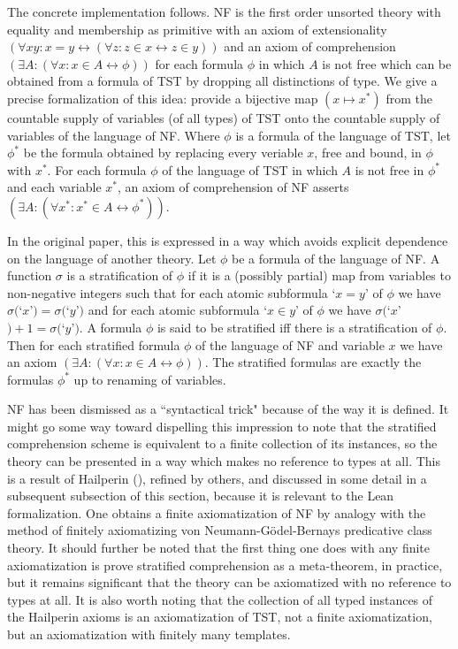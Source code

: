 \documentclass[112pt]{article}
\begin{document}
The concrete implementation follows.  NF is the first order unsorted theory with equality and membership as primitive with an axiom of extensionality $(\forall xy:x=y \leftrightarrow (\forall z:z \in x \leftrightarrow z\in y))$ and an axiom of comprehension $(\exists A:(\forall x:x \in A \leftrightarrow \phi))$ for each formula $\phi$ in which $A$ is not free which can be obtained from a formula of TST by dropping all distinctions of type.  We give a precise formalization of this idea:  provide a bijective map $(x \mapsto x^*)$ from the countable supply of variables (of all types) of TST onto the countable supply of variables of the language of NF.  Where $\phi$ is a formula of the language of TST, let $\phi^*$ be the formula obtained by replacing every veriable $x$, free and bound,
in $\phi$ with $x^*$. For each formula $\phi$ of the language of TST in which $A$ is not free in $\phi^*$ and each variable $x^*$, an axiom of comprehension of NF asserts $(\exists A:(\forall x^*:x^* \in A \leftrightarrow \phi^*))$.

In the original paper, this is expressed in a way which avoids explicit dependence on the language of another theory.  Let $\phi$ be a formula of the language of
NF.  A function $\sigma$ is a stratification of $\phi$ if it is a (possibly partial) map from variables to non-negative integers such that for each atomic subformula
`$x=y$'  of $\phi$ we have $\sigma($`$x$'$)=\sigma($`$y$'$)$ and for each atomic subformula `$x \in y$' of $\phi$ we have $\sigma($`$x$'$)+1 = \sigma($`$y$'$)$.
A formula $\phi$ is said to be stratified iff there is a stratification of $\phi$.  Then for each stratified formula $\phi$ of the language of NF and variable $x$ we have an axiom $(\exists A:(\forall x:x \in A \leftrightarrow \phi))$.  The stratified formulas are exactly the formulas $\phi^*$ up to renaming of variables.

NF has been dismissed as a ``syntactical trick" because of the way it is defined.  It might go some way toward dispelling this impression to note that the stratified comprehension scheme is equivalent to a finite collection of its instances, so the theory can be presented in a way which makes no reference to types at all.  This is a result of Hailperin (\cite{hailperin}), refined by others, and discussed in some detail in a subsequent subsection of this section, because it is relevant to the Lean formalization.  One obtains a finite axiomatization of NF by analogy with the method of finitely axiomatizing von Neumann-G\"odel-Bernays predicative class theory.  It should further be noted that the first thing one does with any finite axiomatization is prove stratified comprehension as a meta-theorem, in practice, but it remains significant that the theory can be axiomatized with no reference to types at all.  It is also worth noting that the collection of all typed instances of the Hailperin axioms is an axiomatization of TST, not a finite axiomatization, but an axiomatization with finitely many templates.
\end{document}
